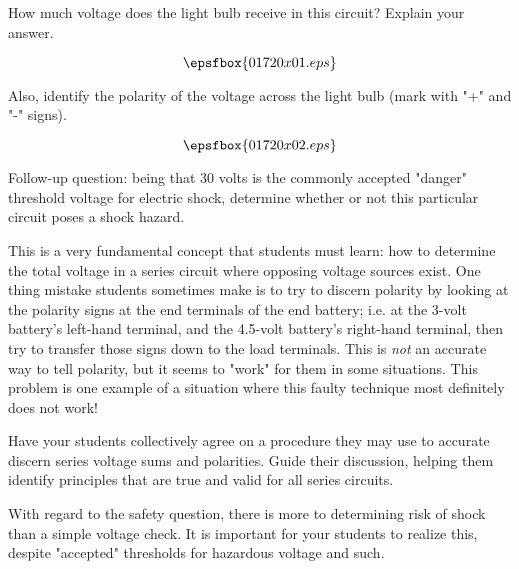 

How much voltage does the light bulb receive in this circuit?  Explain your answer.

$$\epsfbox{01720x01.eps}$$

Also, identify the polarity of the voltage across the light bulb (mark with "+" and "-" signs).







$$\epsfbox{01720x02.eps}$$

\vskip 10pt

Follow-up question: being that 30 volts is the commonly accepted "danger" threshold voltage for electric shock, determine whether or not this particular circuit poses a shock hazard.







This is a very fundamental concept that students must learn: how to determine the total voltage in a series circuit where opposing voltage sources exist.  One thing mistake students sometimes make is to try to discern polarity by looking at the polarity signs at the end terminals of the end battery; i.e. at the 3-volt battery's left-hand terminal, and the 4.5-volt battery's right-hand terminal, then try to transfer those signs down to the load terminals.  This is {\it not} an accurate way to tell polarity, but it seems to "work" for them in some situations.  This problem is one example of a situation where this faulty technique most definitely does not work!

Have your students collectively agree on a procedure they may use to accurate discern series voltage sums and polarities.  Guide their discussion, helping them identify principles that are true and valid for all series circuits.

With regard to the safety question, there is more to determining risk of shock than a simple voltage check.  It is important for your students to realize this, despite "accepted" thresholds for hazardous voltage and such. 




